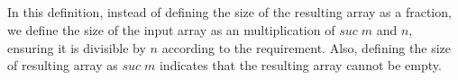 \documentclass{l4proj}
\begin{document}
\begin{code}
\AgdaOperator{\AgdaFunction{]}}\<%
\\
\>[0]\AgdaSpace{}%
\AgdaSpace{}%
\AgdaSymbol{\{}\AgdaSpace{}%
\AgdaSymbol{\}}\AgdaSpace{}%
\AgdaSpace{}%
\AgdaInductiveConstructor{[]}\AgdaSpace{}%
\AgdaSymbol{=}%
\>[553I]\AgdaSpace{}%
\AgdaSpace{}%
\AgdaSymbol{=}\AgdaSpace{}%
\AgdaSpace{}%
\<%
\\
\>[.][@{}l@{}]\<[553I]%
\>[28]\AgdaSpace{}%
\AgdaSpace{}%
\AgdaSpace{}%
\AgdaSpace{}%
\AgdaSpace{}%
\AgdaSymbol{\{}\AgdaSymbol{\}}\AgdaSpace{}%
\AgdaSpace{}%
\AgdaInductiveConstructor{[]}\<%
\\
\>[0]\AgdaSpace{}%
\AgdaSymbol{(}\AgdaSpace{}%
\AgdaSymbol{)}\AgdaSpace{}%
\AgdaSymbol{\{}\AgdaSpace{}%
\AgdaSymbol{\}}\AgdaSpace{}%
\AgdaSpace{}%
\AgdaSpace{}%
\AgdaSymbol{=}%
\>[572I]\AgdaOperator{\AgdaFunction{[}}\AgdaSpace{}%
\AgdaSpace{}%
\AgdaSpace{}%
\AgdaSymbol{(}\AgdaSpace{}%
\AgdaSymbol{(}\AgdaSpace{}%
\AgdaSymbol{)}\AgdaSpace{}%
\AgdaSymbol{\{}\AgdaSpace{}%
\AgdaSymbol{(}\AgdaSpace{}%
\AgdaOperator{\AgdaPrimitive{+}}\AgdaSpace{}%
\AgdaSymbol{(}\AgdaSpace{}%
\AgdaOperator{\AgdaPrimitive{*}}\AgdaSpace{}%
\AgdaSpace{}%
\AgdaSymbol{))\}}\AgdaSpace{}%
\AgdaSymbol{)}\AgdaSpace{}%
\AgdaOperator{\AgdaFunction{]}}\<%
\\
\>[.][@{}l@{}]\<[572I]%
\>[31]\AgdaOperator{\AgdaFunction{++}}\AgdaSpace{}%
\AgdaSpace{}%
\AgdaSymbol{(}\AgdaSpace{}%
\AgdaSymbol{)}\AgdaSpace{}%
\AgdaSymbol{\{}\AgdaSymbol{\}}\AgdaSpace{}%
\AgdaSpace{}%
\AgdaSymbol{((}\AgdaSpace{}%
\AgdaSymbol{(}\AgdaSpace{}%
\AgdaSymbol{)}\AgdaSpace{}%
\AgdaSymbol{))}\<%
\end{code}
In this definition, instead of defining the size of the resulting array as a fraction, we define the size of the input array as an multiplication of $suc\; m$ and $n$, ensuring it is divisible by $n$ according to the requirement. Also, defining the size of resulting array as $suc\; m$ indicates that the resulting array cannot be empty.
\end{document}
